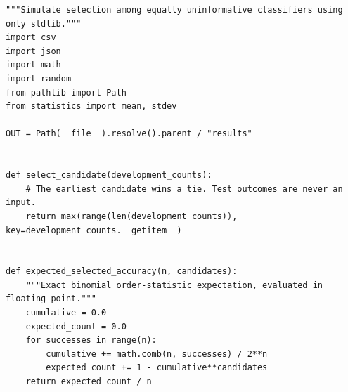 \begin{Verbatim}[breaklines,breakanywhere,fontsize=\small]
"""Simulate selection among equally uninformative classifiers using only stdlib."""
import csv
import json
import math
import random
from pathlib import Path
from statistics import mean, stdev

OUT = Path(__file__).resolve().parent / "results"


def select_candidate(development_counts):
    # The earliest candidate wins a tie. Test outcomes are never an input.
    return max(range(len(development_counts)), key=development_counts.__getitem__)


def expected_selected_accuracy(n, candidates):
    """Exact binomial order-statistic expectation, evaluated in floating point."""
    cumulative = 0.0
    expected_count = 0.0
    for successes in range(n):
        cumulative += math.comb(n, successes) / 2**n
        expected_count += 1 - cumulative**candidates
    return expected_count / n



\end{Verbatim}
